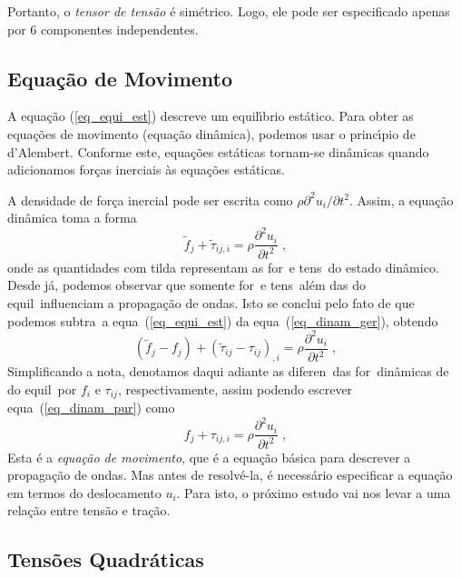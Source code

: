 Portanto, o {\it tensor de tens\~ao} \'e sim\'etrico. Logo, ele
pode ser especificado apenas por 6 componentes independentes.



\subsection{Equa\c{c}\~ao de Movimento}

A equa\c{c}\~ao (\ref{eq_equi_est}) descreve um equil\'{\i}brio
est\'atico. Para obter as equa\c{c}\~oes de movimento
(equa\c{c}\~ao din\^amica), podemos usar o princ\'{\i}pio de
d'Alembert. Conforme este, equa\c{c}\~oes est\'aticas tornam-se
din\^amicas quando adicionamos for\c{c}as inerciais \`as
equa\c{c}\~oes est\'aticas.

A densidade de for\c{c}a inercial pode ser escrita como $\rho
\partial^2u_i / \partial t^2$. Assim, a equa\c{c}\~ao din\^amica toma a
forma
\begin{equation}
\tilde{f}_j + \tilde{\tau}_{ij,i} = \rho \frac{
\partial^2u_i }{ \partial t^2 }\;,
\label{eq_dinam_ger}
\end{equation}
onde as quantidades com tilda representam as for\cas\ e tens\oes\ do
estado din\^amico. Desde j\'a, podemos observar que somente for\cas\ e
tens\oes\ al\'em das do equil\ibrio\ influenciam a propaga\c{c}\~ao de
ondas. Isto se conclui pelo fato de que podemos subtra\ir\ a equa\cao\
(\ref{eq_equi_est}) da equa\cao\ (\ref{eq_dinam_ger}), obtendo
\begin{equation}
(\tilde{f}_j -f_j) + (\tilde{\tau}_{ij}-\tau_{ij})_{,i} = \rho \frac{
\partial^2u_i }{ \partial t^2 }\;,
\label{eq_dinam_pur}
\end{equation}
Simplificando a nota\cao, denotamos daqui adiante as diferen\cas\ das
for\cas\ din\^amicas de do equil\ibrio\ por $f_i$ e $\tau_{ij}$,
respectivamente, assim podendo escrever equa\cao\ (\ref{eq_dinam_pur})
como
\begin{equation}
f_j + \tau_{ij,i} = \rho \frac{
\partial^2u_i }{ \partial t^2 }\;,
\label{eq_dinam}
\end{equation}
Esta \'e a {\it equa\c{c}\~ao de movimento}, que \'e a equa\c{c}\~ao
b\'asica para descrever a propaga\c{c}\~ao de ondas. Mas antes de
resolv\'e-la, \'e necess\'ario especificar a equa\c{c}\~ao em termos do
deslocamento $u_i$. Para isto, o pr\'oximo estudo vai nos levar a uma
rela\c{c}\~ao entre tens\~ao e tra\c{c}\~ao.



\subsection{Tens\~oes Quadr\'aticas}

